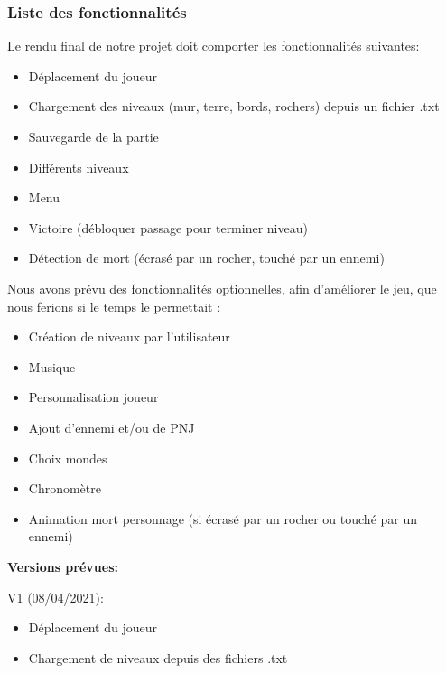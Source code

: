         \subsubsection{Liste des fonctionnalités}\label{sssect:fonctionnalites}
            Le rendu final de notre projet doit comporter les fonctionnalités suivantes:
            \vspace{0.2cm}
            \begin{itemize}
                \item Déplacement du joueur 
                \item Chargement des niveaux (mur, terre, bords, rochers) depuis un fichier .txt
                \item Sauvegarde de la partie 
                \item Différents niveaux
                \item Menu
                \item Victoire (débloquer passage pour terminer niveau)
                \item Détection de mort (écrasé par un rocher, touché par un ennemi) 
            \end{itemize}
            \vspace{0.3cm}
            Nous avons prévu des fonctionnalités optionnelles, afin d'améliorer le jeu, que nous ferions si le temps le permettait :
            \vspace{0.2cm}
            \begin{itemize}
                \item Création de niveaux par l’utilisateur
                \item Musique 
                \item Personnalisation joueur
                \item Ajout d’ennemi  et/ou de PNJ
                \item Choix mondes
                \item Chronomètre 
                \item Animation mort personnage (si écrasé par un rocher ou touché par un ennemi)
            \end{itemize}
            
            \vspace{0.3cm}
            \textbf{Versions prévues:}
            
            V1 (08/04/2021):
            \begin{itemize}
                \item Déplacement du joueur
                \item Chargement de niveaux depuis des fichiers .txt 
            \end{itemize}
            \vspace{0.2cm}
            
